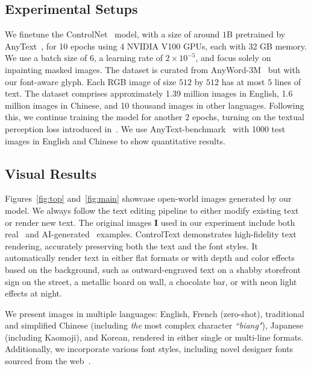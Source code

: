 \subsection{Experimental Setups}
We finetune the ControlNet~\cite{zhang2023adding} model, with a size of around $1$B pretrained by AnyText~\cite{tuo2023anytext}, for 10 epochs using 4 NVIDIA V100 GPUs, each with 32 GB memory. 
We use a batch size of 6, a learning rate of $2 \times 10^{-5}$, and focus solely on inpainting masked images.
The dataset is curated from AnyWord-3M~\cite{tuo2023anytext} but with our font-aware glyph. Each RGB image of size $512$ by $512$ has at most $5$ lines of text. The dataset comprises approximately 1.39 million images in English, 1.6 million images in Chinese, and 10 thousand images in other languages. Following this, we continue training the model for another 2 epochs, turning on the textual perception loss introduced in~\cite{tuo2023anytext}. We use AnyText-benchmark~\cite{tuo2023anytext} with 1000 test images in English and Chinese to show quantitative results.  


\subsection{Visual Results}
Figures~\ref{fig:top} and~\ref{fig:main} showcase open-world images generated by our model. We always follow the text editing pipeline to either modify existing text or render new text. The original images $\boldsymbol{I}$ used in our experiment include both real~\cite{pixta_photo_93233725, unsplash, businessinsider_takeout, cnn_nyc_restaurants, peterpom211_x_post, tripadvisor_chicago_dark_side, nipic_image} and AI-generated~\cite{theatre_dopera_spatial, midjourney_prompts} examples. ControlText demonstrates high-fidelity text rendering, accurately preserving both the text and the font styles. It automatically render text in either flat formats or with depth and color effects based on the background, such as outward-engraved text on a shabby storefront sign on the street, a metallic board on wall, a chocolate bar, or with neon light effects at night. 

We present images in multiple languages: English, French (zero-shot), traditional and simplified Chinese (including \textit{the} most complex character \textit{``biang"}), Japanese (including Kaomoji), and Korean, rendered in either single or multi-line formats. Additionally, we incorporate various font styles, including novel designer fonts sourced from the web~\cite{apple_fonts, fonts_net_cn}.



